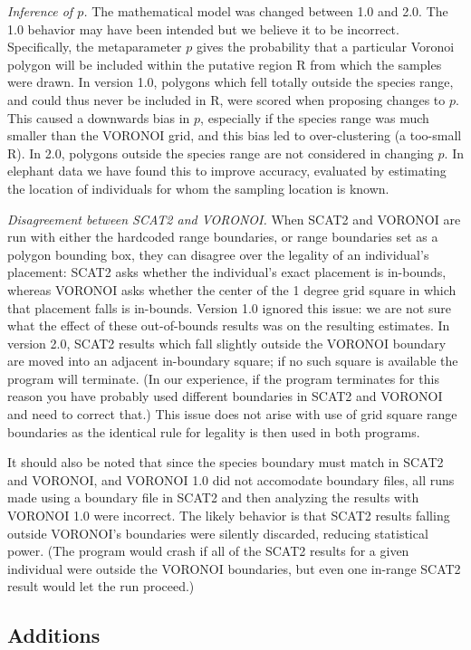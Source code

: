 \documentclass[10pt,titlepage,times,letterpaper]{article}
\begin{document}
{\it Inference of $p$.}  The mathematical model was changed between 1.0 and 2.0.   
The 1.0 behavior may have been
intended but we believe it to be incorrect.   Specifically, the metaparameter
$p$ gives the probability that a particular Voronoi polygon will be included within
the putative region R from which the samples were drawn.  In version 1.0, polygons which
fell totally outside the species range, and could thus never be included in R,
were scored when proposing changes to $p$.  This caused a downwards bias in $p$,
especially if the species range was much smaller than the VORONOI grid, and this bias
led to over-clustering (a too-small R).  In 2.0, polygons outside the species range
are not considered in changing $p$.  In elephant data we have found this to improve
accuracy, evaluated by estimating the location of individuals for whom the sampling
location is known. 

{\it Disagreement between SCAT2 and VORONOI.}  When SCAT2 and VORONOI are 
run with either the hardcoded range boundaries, or range
boundaries set as a polygon bounding box, they can disagree over the legality of an 
individual's placement:  SCAT2 asks whether the individual's exact placement is in-bounds,
whereas VORONOI asks whether the center of the 1 degree grid square in which that
placement falls is in-bounds.  Version 1.0 ignored this issue:  we are not sure what the
effect of these out-of-bounds results was on the resulting estimates.
In version 2.0, SCAT2 results which fall slightly outside the
VORONOI boundary are moved into an adjacent in-boundary square; if no such square is
available the program will terminate.  (In our experience, if the program terminates for
this reason you have probably used different boundaries in SCAT2 and VORONOI and need
to correct that.)   This issue does not arise with use of grid square
range boundaries as the identical rule for legality is then used in both programs.

It should also be noted that since the species boundary must match in SCAT2 and VORONOI,
and VORONOI 1.0 did not accomodate boundary files, all runs made using a boundary file
in SCAT2 and then analyzing the results with VORONOI 1.0 were incorrect.  The
likely behavior is that SCAT2 results falling outside VORONOI's boundaries were
silently discarded, reducing statistical power.  (The program would crash
if all of the SCAT2 results for a given individual were outside the
VORONOI boundaries, but even one in-range SCAT2 result would let the run proceed.)

\subsection{Additions}
\end{document}
